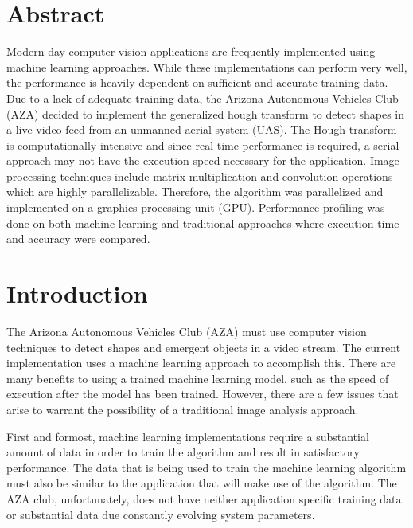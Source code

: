 \documentclass[conference]{IEEEtran}
\begin{document}
\section*{Abstract}
Modern day computer vision applications are frequently implemented using machine learning approaches.
While these implementations can perform very well, the performance is heavily dependent on sufficient and accurate training data.
Due to a lack of adequate training data, the Arizona Autonomous Vehicles Club (AZA) decided to implement the generalized hough transform to detect shapes in a live video feed from an unmanned aerial system (UAS).
The Hough transform is computationally intensive and since real-time performance is required, a serial approach may not have the execution speed necessary for the application.
Image processing techniques include matrix multiplication and convolution operations which are highly parallelizable.
Therefore, the algorithm was parallelized and implemented on a graphics processing unit (GPU).
Performance profiling was done on both machine learning and traditional approaches where execution time and accuracy were compared.





\section*{Introduction}

The Arizona Autonomous Vehicles Club (AZA) must use computer vision techniques to detect shapes and emergent objects in a video stream.
The current implementation uses a machine learning approach to accomplish this.
There are many benefits to using a trained machine learning model, such as the speed of execution after the model has been trained.
However, there are a few issues that arise to warrant the possibility of a traditional image analysis approach.

First and formost, machine learning implementations require a substantial amount of data in order to train the algorithm and result in satisfactory performance. 
The data that is being used to train the machine learning algorithm must also be similar to the application that will make use of the algorithm. 
The AZA club, unfortunately, does not have neither application specific training data or substantial data due constantly evolving system parameters. 
\end{document}
